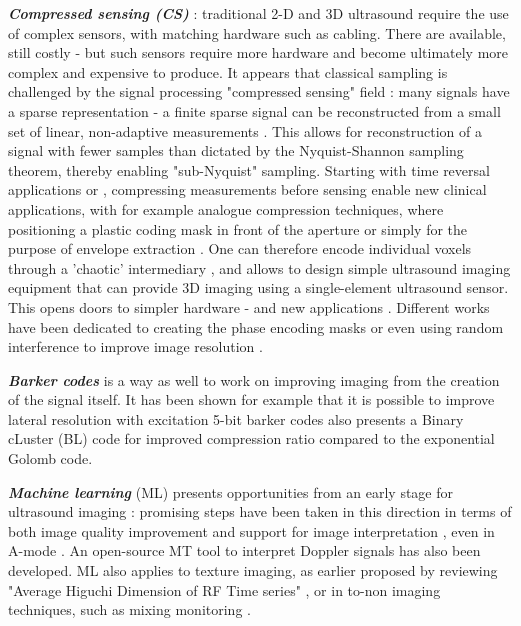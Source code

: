 \documentclass{article}
\begin{document}
\textbf{\textit{Compressed sensing (CS)}} : traditional 2-D and 3D ultrasound require the use of complex sensors, with matching hardware such as cabling. There are available, still costly - but such sensors require more hardware and become ultimately more complex and expensive to produce. 
It appears that classical sampling is challenged by the signal processing "compressed sensing" field \cite{liutkus_imaging_2014}: many signals have a sparse representation - a finite sparse signal can be reconstructed from a small set of linear, non-adaptive measurements \cite{hua_compressed_2011}. This allows for reconstruction of a signal with fewer samples than dictated by the Nyquist-Shannon sampling theorem, thereby enabling "sub-Nyquist" sampling. Starting with time reversal applications \cite{montaldo_time_2004, montaldo_building_2005} or \cite{sarvazyan_comparative_2009}, compressing measurements before sensing enable new clinical applications, with for example analogue compression techniques, where positioning a plastic coding mask in front of the aperture \cite{fedjajevs_ultrasound_2016} or simply for the purpose of envelope extraction \cite{kim_signal-processing_2020}.  One can therefore encode individual voxels through a 'chaotic' intermediary \cite{luong_compact_2016}, and allows to design simple ultrasound imaging equipment that can provide 3D imaging using a single-element ultrasound sensor. This opens doors to simpler hardware - and new applications \cite{kruizinga_compressive_2017}. Different works have been dedicated to creating the phase encoding masks \cite{van_der_meulen_spatial_2017} or even using random interference to improve image resolution \cite{ni_high-resolution_2020}.

\textbf{\textit{Barker codes}} is a way as well to work on improving imaging from the creation of the signal itself. It has been shown for example that it is possible to improve lateral resolution with excitation 5-bit barker codes \cite{fujita_effect_2017, chun_ultrasound_2015, kim_real-time_2018} also presents a Binary cLuster (BL) code for improved compression ratio compared to the exponential Golomb code.

\textbf{\textit{Machine learning}} (ML) presents opportunities from an early stage for ultrasound imaging : promising steps have been taken in this direction in terms of both image quality improvement \cite{wang_high-resolution_2019, hewener_mobile_2019} and support for image interpretation \cite{divya_krishna_computer_2016}, even in A-mode \cite{brausch_classifying_2019}. An open-source MT tool to interpret Doppler signals \cite{dhutia_open-source_2017} has also been developed. ML also applies to texture imaging, as earlier proposed by reviewing "Average Higuchi Dimension of RF Time series" \cite{moradi_detection_2006}, or in to-non imaging techniques, such as mixing monitoring \cite{bowler_monitoring_2020}.
\end{document}
